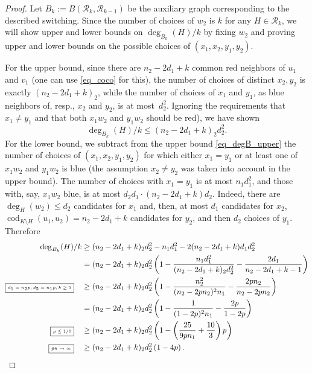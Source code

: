 \documentclass[12pt,reqno]{amsart}
\newcommand{\rc}{{\mathcal{R}}}
\newcommand{\cod}{\operatorname{cod}}
\theoremstyle{definition}
\newcommand{\justify}[1]{\fbox{\tiny{#1}}\quad}
\begin{document}
\begin{proof}
 Let $B_k := B(\rc_k, \rc_{k-1})$ be the auxiliary graph corresponding to the described switching.
Since the number of choices of $w_2$ is $k$ for any $H \in \rc_k$, we will show upper and lower bounds on $\deg_{B_k}(H)/k$ by fixing $w_2$ and proving upper and lower bounds on the possible choices of $(x_1, x_2, y_1, y_2)$. 
  
For the upper bound, since there are  $n_2 - 2d_1 + k$ common red neighbors of $u_1$ and $v_1$ (one can use \eqref{eq_coco} for this), the number of choices of distinct $x_2, y_2$ is exactly $(n_2 - 2d_1 + k)_2$, while the number of choices of $x_1$ and $y_1$, as blue neighbors of, resp., $x_2$ and $y_2$, is at most~$d_2^2$. Ignoring the requirements that $x_1\neq y_1$ and that both $x_1w_2$ and $y_1w_2$ should be red), we have shown
  \begin{equation}
    \label{eq_degB_upper}
    \deg_{B_k}(H)/k \le (n_2 - 2d_1 + k)_2d_2^2.
\end{equation}
For the lower bound, we subtract from the upper bound \eqref{eq_degB_upper} the number of choices of $(x_1, x_2, y_1, y_2)$ for which either  $x_1 = y_1$ or at least one of $x_1w_2$ and $y_1w_2$ is blue (the assumption $x_2 \neq y_2$ was taken into account in the upper bound). The number of choices with $x_1 = y_1$ is at most $n_1d_1^2$, and those with, say, $x_1w_2$ blue, is at most $d_2d_1 \cdot (n_2 - 2d_1 + k)d_2 $. Indeed, there are $\deg_H(w_2) \le d_2$ candidates for $x_1$ and, then, at most $d_1$ candidates for $x_2$, $\cod_{K \setminus H}(u_1,u_2) = n_2 - 2d_1 + k$ candidates for $y_2$, and then $d_2$ choices of $y_1$.
Therefore
\begin{align*}
  \deg_{B_k}(H)/k &\ge (n_2 - 2d_1 + k)_2d_2^2 - n_1d_1^2 - 2(n_2 - 2d_1 + k)d_1d_2^2 \\
&= (n_2 - 2d_1 + k)_2 d_2^2 \left( 1 - \frac{n_1d_1^2}{(n_2 - 2d_1 + k)_2 d_2^2} - \frac{2d_1}{n_2 - 2d_1 + k - 1}\right) \\
\justify{$d_1 = n_2p, d_2 = n_1p, k \ge 1$}& \ge  (n_2 - 2d_1 + k)_2 d_2^2 \left( 1 - \frac{n_2^2}{(n_2 - 2pn_2)^2 n_1} - \frac{2pn_2}{n_2 - 2pn_2}\right) \\
&= (n_2 - 2d_1 + k)_2 d_2^2 \left( 1 - \frac{1}{(1 - 2p)^2n_1} - \frac{2p}{1 - 2p}\right) \\
\justify{$p\le1/5$} &\ge (n_2 - 2d_1 + k)_2 d_2^2 \left( 1 - \left( \frac{25}{9pn_1} + \frac{10}{3} \right) p \right) \\
\justify{$\hat p \hat n \to \infty$} &\ge (n_2 - 2d_1 + k)_2 d_2^2 \left( 1 - 4p \right).
\end{align*}


\end{proof}
\end{document}
